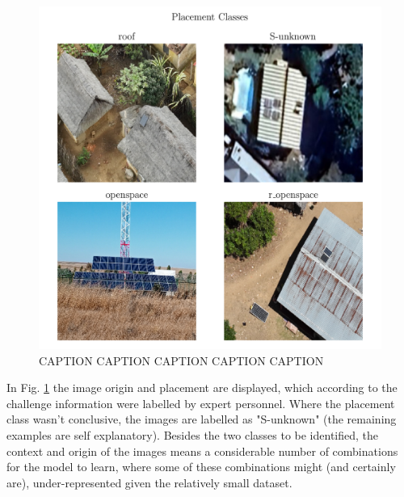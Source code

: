 \documentclass[conference]{IEEEtran}
\begin{document}
\begin{figure}[H]
    \centering
    \includegraphics[width=1\linewidth]{assets/data_placement_classes.png}
    \caption{CAPTION CAPTION CAPTION CAPTION CAPTION}
    \label{fig:data_placement_classes}
\end{figure}

In Fig. \ref{fig:data_placement_classes} the image origin and placement are displayed, which according to the challenge information were labelled by expert personnel. Where the placement class wasn't conclusive, the images are labelled as "S-unknown" (the remaining examples are self explanatory). Besides the two classes to be identified, the context and origin of the images means a considerable number of combinations for the model to learn, where some of these combinations might (and certainly are), under-represented given the relatively small dataset.

\end{document}
